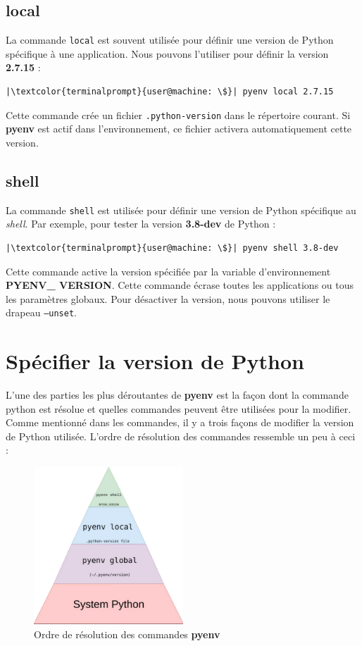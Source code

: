 \subsection*{local}
La commande \texttt{local} est souvent utilisée pour définir une version de Python spécifique à une application. Nous pouvons l'utiliser pour définir la version \textbf{2.7.15} :
\begin{lstlisting}[style=terminal]
|\textcolor{terminalprompt}{user@machine: \$}| pyenv local 2.7.15
\end{lstlisting}

Cette commande crée un fichier \texttt{.python-version} dans le répertoire courant. Si \textbf{pyenv} est actif dans l'environnement, ce fichier activera automatiquement cette version.

\subsection*{shell}
La commande \texttt{shell} est utilisée pour définir une version de Python spécifique au \textit{shell}. Par exemple, pour tester la version \textbf{3.8-dev} de Python :
\begin{lstlisting}[style=terminal]
|\textcolor{terminalprompt}{user@machine: \$}| pyenv shell 3.8-dev
\end{lstlisting}

Cette commande active la version spécifiée par la variable d'environnement \textbf{PYENV\_ VERSION}. Cette commande écrase toutes les applications ou tous les paramètres globaux. Pour désactiver la version, nous pouvons utiliser le drapeau \texttt{--unset}.

\section{Spécifier la version de Python}
L'une des parties les plus déroutantes de \textbf{pyenv} est la façon dont la commande python est résolue et quelles commandes peuvent être utilisées pour la modifier. Comme mentionné dans les commandes, il y a trois façons de modifier la version de Python utilisée. L'ordre de résolution des commandes ressemble un peu à ceci :

\begin{figure}[h!]
    \centering
    \includegraphics[width=0.5\textwidth]{IMG/pyenv.png} 
    \caption{Ordre de résolution des commandes \textbf{pyenv}}
\end{figure}

